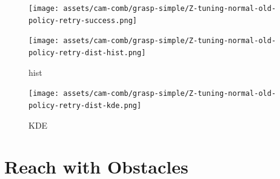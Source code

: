 \begin{figure}[htpb] %
  \centering
  \texttt{[image: assets/cam-comb/grasp-simple/Z-tuning-normal-old-policy-retry-success.png]}
  \caption{}\label{fig:Z-grasp-tuning-dist}
\end{figure}

\begin{figure}[htpb]
  \centering
  \texttt{[image: assets/cam-comb/grasp-simple/Z-tuning-normal-old-policy-retry-dist-hist.png]}
  \caption{hist}\label{subfig:}
\end{figure}

\begin{figure}[htpb]
  \centering
  \texttt{[image: assets/cam-comb/grasp-simple/Z-tuning-normal-old-policy-retry-dist-kde.png]}
  \caption{KDE}\label{subfig:}
\end{figure}



\section{Reach with Obstacles}